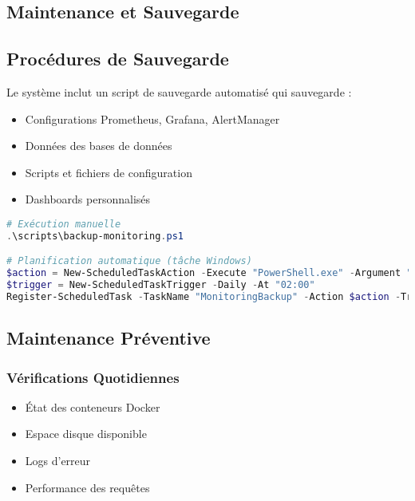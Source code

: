 \documentclass[12pt,a4paper]{report}
\begin{document}
\begin{table}[H]
\begin{itemize}
\begin{table}[H]
\chapter{Maintenance et Sauvegarde}

\section{Procédures de Sauvegarde}

Le système inclut un script de sauvegarde automatisé qui sauvegarde :

\begin{itemize}
    \item Configurations Prometheus, Grafana, AlertManager
    \item Données des bases de données
    \item Scripts et fichiers de configuration
    \item Dashboards personnalisés
\end{itemize}

\begin{lstlisting}[language=powershell, caption=Script de sauvegarde]
# Exécution manuelle
.\scripts\backup-monitoring.ps1

# Planification automatique (tâche Windows)
$action = New-ScheduledTaskAction -Execute "PowerShell.exe" -Argument "-File C:\monitoring\scripts\backup-monitoring.ps1"
$trigger = New-ScheduledTaskTrigger -Daily -At "02:00"
Register-ScheduledTask -TaskName "MonitoringBackup" -Action $action -Trigger $trigger
\end{lstlisting}

\section{Maintenance Préventive}

\subsection{Vérifications Quotidiennes}

\begin{itemize}
    \item État des conteneurs Docker
    \item Espace disque disponible
    \item Logs d'erreur
    \item Performance des requêtes
\end{itemize}


\end{table}
\end{itemize}
\end{table}
\end{document}
